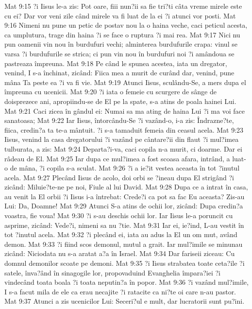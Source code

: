 Mat 9:15  ?i Iisus le-a zis: Pot oare, fiii nun?ii sa fie tri?ti câta vreme mirele este cu ei? Dar vor veni zile când mirele va fi luat de la ei ?i atunci vor posti.
Mat 9:16  Nimeni nu pune un petic de postav nou la o haina veche, caci peticul acesta, ca umplutura, trage din haina ?i se face o ruptura ?i mai rea.
Mat 9:17  Nici nu pun oamenii vin nou în burdufuri vechi; alminterea burdufurile crapa: vinul se varsa ?i burdufurile se strica; ci pun vin nou în burdufuri noi ?i amândoua se pastreaza împreuna.
Mat 9:18  Pe când le spunea acestea, iata un dregator, venind, I s-a închinat, zicând: Fiica mea a murit de curând dar, venind, pune mâna Ta peste ea ?i va fi vie.
Mat 9:19  Atunci Iisus, sculându-Se, a mers dupa el împreuna cu ucenicii.
Mat 9:20  ?i iata o femeie cu scurgere de sânge de doisprezece ani, apropiindu-se de El pe la spate, s-a atins de poala hainei Lui.
Mat 9:21  Caci zicea în gândul ei: Numai sa ma ating de haina Lui ?i ma voi face sanatoasa;
Mat 9:22  Iar Iisus, întorcându-Se ?i vazând-o, i-a zis: Îndrazne?te, fiica, credin?a ta te-a mântuit. ?i s-a tamaduit femeia din ceasul acela.
Mat 9:23  Iisus, venind la casa dregatorului ?i vazând pe cântare?ii din flaut ?i mul?imea tulburata, a zis:
Mat 9:24  Departa?i-va, caci copila n-a murit, ci doarme. Dar ei râdeau de El.
Mat 9:25  Iar dupa ce mul?imea a fost scoasa afara, intrând, a luat-o de mâna, ?i copila s-a sculat.
Mat 9:26  ?i a ie?it vestea aceasta în tot ?inutul acela.
Mat 9:27  Plecând Iisus de acolo, doi orbi se ?ineau dupa El strigând ?i zicând: Miluie?te-ne pe noi, Fiule al lui David.
Mat 9:28  Dupa ce a intrat în casa, au venit la El orbii ?i Iisus i-a întrebat: Crede?i ca pot sa fac Eu aceasta? Zis-au Lui: Da, Doamne!
Mat 9:29  Atunci S-a atins de ochii lor, zicând: Dupa credin?a voastra, fie voua!
Mat 9:30  ?i s-au deschis ochii lor. Iar Iisus le-a poruncit cu asprime, zicând: Vede?i, nimeni sa nu ?tie.
Mat 9:31  Iar ei, ie?ind, L-au vestit în tot ?inutul acela.
Mat 9:32  ?i plecând ei, iata au adus la El un om mut, având demon.
Mat 9:33  ?i fiind scos demonul, mutul a grait. Iar mul?imile se minunau zicând: Niciodata nu s-a aratat a?a în Israel.
Mat 9:34  Dar fariseii ziceau: Cu domnul demonilor scoate pe demoni.
Mat 9:35  ?i Iisus strabatea toate ceta?ile ?i satele, înva?ând în sinagogile lor, propovaduind Evanghelia împara?iei ?i vindecând toata boala ?i toata neputin?a în popor.
Mat 9:36  ?i vazând mul?imile, I s-a facut mila de ele ca erau necajite ?i ratacite ca ni?te oi care n-au pastor.
Mat 9:37  Atunci a zis ucenicilor Lui: Seceri?ul e mult, dar lucratorii sunt pu?ini.
